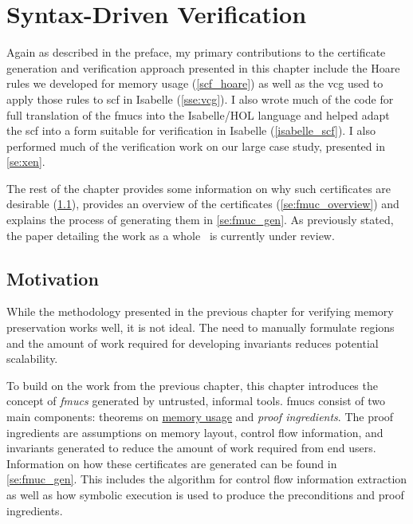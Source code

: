 \chapter{Syntax-Driven Verification}\label{ch:syntax}

Again as described in the preface,
my primary contributions to the certificate generation and verification approach%
presented in this chapter include the Hoare rules we developed
for memory usage (\cref{scf_hoare})
as well as the \ac{vcg} used to apply those rules
to \ac{scf} in Isabelle (\cref{sse:vcg}).
I also wrote much of the code for full translation of the \acp{fmuc}
into the Isabelle/HOL language
and helped adapt the \ac{scf} into a form suitable for verification
in Isabelle (\cref{isabelle_scf}).
I also performed much of the verification work on our large case study,
presented in \cref{se:xen}.

The rest of the chapter provides some information
on why such certificates are desirable (\cref{se:fmuc_motivation}),
provides an overview of the certificates (\cref{se:fmuc_overview})
and explains the process of generating them in \cref{se:fmuc_gen}.
As previously stated,
the paper detailing the work as a whole~\citep{popl2019underreview}
is currently under review.

\section{Motivation}\label{se:fmuc_motivation}
While the methodology presented in the previous chapter
for verifying memory preservation works well, it is not ideal.
The need to manually formulate regions
and the amount of work required for developing invariants
reduces potential scalability.

To build on the work from the previous chapter,
this chapter introduces the concept of \emph{\acfp{fmuc}}
generated by untrusted, informal tools.
\Acp{fmuc} consist of two main components:
theorems on \hyperref[ch:memory]{memory usage} and \emph{proof ingredients}.%
The proof ingredients are assumptions on memory layout,
control flow information, and invariants
generated to reduce the amount of work required from end users.
Information on how these certificates are generated
can be found in \cref{se:fmuc_gen}.
This includes the algorithm for control flow information extraction
as well as how symbolic execution is used
to produce the preconditions and proof ingredients.

